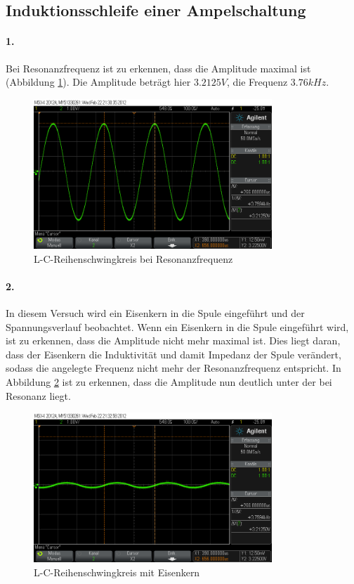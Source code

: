 \documentclass[a4paper]{article}
\begin{document}
\subsection{Induktionsschleife einer Ampelschaltung}
\paragraph{1.}
Bei Resonanzfrequenz ist zu erkennen, dass die Amplitude maximal ist (Abbildung \ref{fig:versuch4-resonanz}). Die Amplitude beträgt hier $3.2125\si{V}$, die Frequenz $3.76\si{kHz}$.

\begin{figure}[H]
    \centering
    \includegraphics[width=0.8\textwidth]{versuch4_maxamplitude.png}
    \caption{L-C-Reihenschwingkreis bei Resonanzfrequenz}
    \label{fig:versuch4-resonanz}
\end{figure}

\paragraph{2.}
In diesem Versuch wird ein Eisenkern in die Spule eingeführt und der Spannungsverlauf beobachtet.
Wenn ein Eisenkern in die Spule eingeführt wird, ist zu erkennen, dass die Amplitude nicht mehr maximal ist. Dies liegt daran, dass der Eisenkern die Induktivität und damit Impedanz der Spule verändert, sodass die angelegte Frequenz nicht mehr der Resonanzfrequenz entspricht. In Abbildung \ref{fig:versuch4-minamplitude} ist zu erkennen, dass die Amplitude nun deutlich unter der bei Resonanz liegt.

\begin{figure}[H]
    \centering
    \includegraphics[width=0.8\textwidth]{versuch4_lowamplitude.png}
    \caption{L-C-Reihenschwingkreis mit Eisenkern}
    \label{fig:versuch4-minamplitude}
\end{figure}
\end{document}
